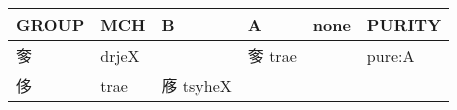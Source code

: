 \documentclass[14pt,a4paper]{scrartcl}
\begin{document}
\begin{longtable}[c]{@{}llllll@{}}
\toprule
\begin{minipage}[b]{0.14\columnwidth}\raggedright\strut
GROUP
\strut\end{minipage} &
\begin{minipage}[b]{0.14\columnwidth}\raggedright\strut
MCH
\strut\end{minipage} &
\begin{minipage}[b]{0.14\columnwidth}\raggedright\strut
B
\strut\end{minipage} &
\begin{minipage}[b]{0.14\columnwidth}\raggedright\strut
A
\strut\end{minipage} &
\begin{minipage}[b]{0.14\columnwidth}\raggedright\strut
none
\strut\end{minipage} &
\begin{minipage}[b]{0.14\columnwidth}\raggedright\strut
PURITY
\strut\end{minipage}\tabularnewline
\midrule
\endhead
\begin{minipage}[t]{0.14\columnwidth}\raggedright\strut
奓
\strut\end{minipage} &
\begin{minipage}[t]{0.14\columnwidth}\raggedright\strut
drjeX
\strut\end{minipage} &
\begin{minipage}[t]{0.14\columnwidth}\raggedright\strut
\strut\end{minipage} &
\begin{minipage}[t]{0.14\columnwidth}\raggedright\strut
奓 trae
\strut\end{minipage} &
\begin{minipage}[t]{0.14\columnwidth}\raggedright\strut
\strut\end{minipage} &
\begin{minipage}[t]{0.14\columnwidth}\raggedright\strut
pure:A
\strut\end{minipage}\tabularnewline
\begin{minipage}[t]{0.14\columnwidth}\raggedright\strut
侈
\strut\end{minipage} &
\begin{minipage}[t]{0.14\columnwidth}\raggedright\strut
trae
\strut\end{minipage} &
\begin{minipage}[t]{0.14\columnwidth}\raggedright\strut
㢋 tsyheX
\strut\end{minipage} &
\begin{minipage}[t]{0.14\columnwidth}\raggedright\strut

\end{minipage}
\end{longtable}
\end{document}
